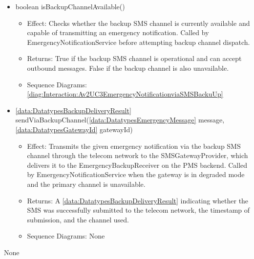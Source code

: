 \begin{description}
\begin{itemize}[noitemsep,nolistsep,leftmargin=-.25cm]
\begin{itemize}[noitemsep,nolistsep]
           \item Returns: A \ref{data:DatatypesbackupChannelType} enum value indicating the backup channel in use, currently always SMS.
           \item Sequence Diagrams: None
        \end{itemize}
      \item \textsf{boolean isBackupChannelAvailable()}
        \begin{itemize}[noitemsep,nolistsep]
           \item Effect: Checks whether the backup SMS channel is currently available and capable of transmitting an emergency notification. Called by EmergencyNotificationService before attempting backup channel dispatch. 
           \item Returns: True if the backup SMS channel is operational and can accept outbound messages. False if the backup channel is also unavailable.
           \item Sequence Diagrams: \cref{diag:Interaction:Av2UC3EmergencyNotificationviaSMSBackuUp}
        \end{itemize}
      \item \textsf{\ref{data:DatatypesBackupDeliveryResult} sendViaBackupChannel(\ref{data:DatatypesEmergencyMessage} message, \ref{data:DatatypesGatewayId} gatewayId)}
        \begin{itemize}[noitemsep,nolistsep]
           \item Effect: Transmits the given emergency notification via the backup SMS channel through the telecom network to the SMSGatewayProvider, which delivers it to the EmergencyBackupReceiver on the PMS backend. Called by EmergencyNotificationService when the gateway is in degraded mode and the primary channel is unavailable. 
           \item Returns: A \ref{data:DatatypesBackupDeliveryResult} indicating whether the SMS was successfully submitted to the telecom network, the timestamp of submission, and the channel used.
           \item Sequence Diagrams: None
        \end{itemize}
    \end{itemize}
      \item[Diagrams:] None
    \end{description}

